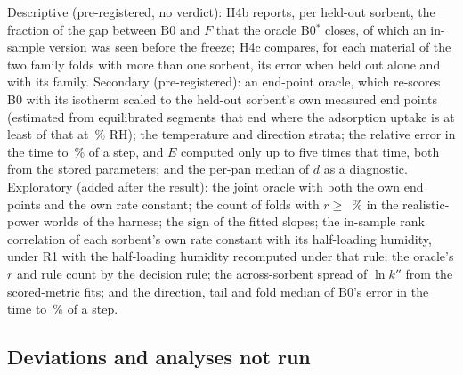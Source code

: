 \documentclass[12pt]{article}
\newcommand{\kpp}{k''}
\begin{document}
Descriptive (pre-registered, no verdict): H4b reports, per held-out sorbent, the fraction of the gap between B0 and
$F$ that the oracle B0$^{*}$ closes, of which an in-sample version was seen before the freeze; H4c compares, for each
material of the two family folds with more than one sorbent, its error when held out alone and with its family.
Secondary (pre-registered): an end-point oracle, which re-scores B0 with its isotherm scaled to the held-out
sorbent's own measured end points (estimated from equilibrated segments that end where the adsorption uptake is at
least  of that at \,\% RH); the temperature and direction strata; the relative error in
the time to \,\% of a step, and $E$ computed only up to five times that time, both from the stored
parameters; and the per-pan median of $d$ as a diagnostic. Exploratory (added after the result): the joint oracle with both the own end
points and the own rate constant; the count of folds with $r \ge$ \,\% in the realistic-power worlds of the
harness; the sign of the fitted slopes; the in-sample rank correlation of each sorbent's own rate constant with its
half-loading humidity, under R1 with the half-loading humidity recomputed under that rule; the oracle's $r$ and rule
count by the decision rule; the across-sorbent spread of $\ln\kpp$ from the scored-metric fits; and the direction,
tail and fold median of B0's error in the time to \,\% of a step.

\subsection{Deviations and analyses not run}
\end{document}
